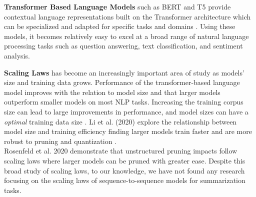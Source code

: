 \textbf{Transformer Based Language Models} such as BERT \cite{Devlin2019BERTPO} and T5 \cite{Raffel2020ExploringTL} provide contextual language representations built on the Transformer architecture \cite{Vaswani2017AttentionIA} which can be specialized and adapted for specific tasks and domains \cite{Lee2020BioBERTAP}. Using these models, it becomes relatively easy to excel at a broad range of natural language processing tasks such as question answering, text classification, and sentiment analysis. \\
\begin{table*}[htb!]
    \centering
    \caption{Information about the architecture and attributes of the FLAN-T5 models}
    \label{tab:models}
\end{table*}
\textbf{Scaling Laws} has become an increasingly important area of study as models' size and training data grows. Performance of the transformer-based language model improves with the relation to model size \cite{Radford2018ImprovingLU} and that larger models outperform smaller models \cite{Brown2020LanguageMA} on most NLP tasks. Increasing the training corpus size can lead to large improvements in performance, and model sizes can have a \textit{optimal} training data size \cite{Hoffmann2022TrainingCL}. Li et al. (2020) \cite{Li2020TrainLT} explore the relationship between model size and training efficiency finding larger models train faster and are more robust to pruning and quantization \cite{Na2022TrainFT}. \\
Rosenfeld et al. 2020 demonstrate that unstructured pruning impacts follow scaling laws \cite{Rosenfeld2020OnTP} where larger models can be pruned with greater ease. Despite this broad study of scaling laws, to our knowledge, we have not found any research focusing on the scaling laws of sequence-to-sequence models for summarization tasks. \\

